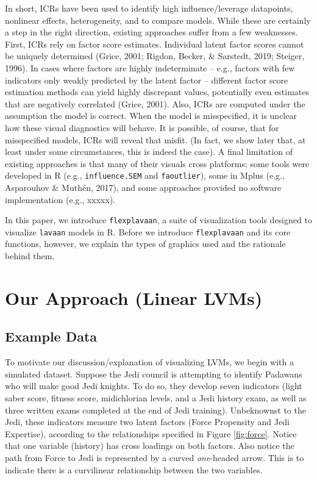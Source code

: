 \documentclass[
  english,
  doc]{apa6}
\begin{document}
In short, ICRs have been used to identify high influence/leverage datapoints, nonlinear effects, heterogeneity, and to compare models. While these are certainly a step in the right direction, existing approaches suffer from a few weaknesses. First, ICRs rely on factor score estimates. Individual latent factor scores cannot be uniquely determined (Grice, 2001; Rigdon, Becker, \& Sarstedt, 2019; Steiger, 1996). In cases where factors are highly indeterminate -- e.g., factors with few indicators only weakly predicted by the latent factor -- different factor score estimation methods can yield highly discrepant values, potentially even estimates that are negatively correlated (Grice, 2001). Also, ICRs are computed under the assumption the model is correct. When the model is misspecified, it is unclear how these visual diagnostics will behave. It is possible, of course, that for misspecified models, ICRs will reveal that misfit. (In fact, we show later that, at least under some circumstances, this is indeed the case). A final limitation of existing approaches is that many of their visuals cross platforms; some tools were developed in R (e.g., \texttt{influence.SEM} and \texttt{faoutlier}), some in Mplus (e.g., Asparouhov \& Muthén, 2017), and some approaches provided no software implementation (e.g., xxxxx).

In this paper, we introduce \texttt{flexplavaan}, a suite of visualization tools designed to visualize \texttt{lavaan} models in R. Before we introduce \texttt{flexplavaan} and its core functions, however, we explain the types of graphics used and the rationale behind them.

\hypertarget{our-approach-linear-lvms}{%
\section{Our Approach (Linear LVMs)}\label{our-approach-linear-lvms}}

\hypertarget{example-data}{%
\subsection{Example Data}\label{example-data}}

To motivate our discussion/explanation of visualizing LVMs, we begin with a simulated dataset. Suppose the Jedi council is attempting to identify Padawans who will make good Jedi knights. To do so, they develop seven indicators (light saber score, fitness score, midichlorian levels, and a Jedi history exam, as well as three written exams completed at the end of Jedi training). Unbeknownst to the Jedi, these indicators measure two latent factors (Force Propensity and Jedi Expertise), according to the relationships specified in Figure \ref{fig:force}. Notice that one variable (history) has cross loadings on both factors. Also notice the path from Force to Jedi is represented by a curved \emph{one}-headed arrow. This is to indicate there is a curvilinear relationship between the two variables.
\end{document}
